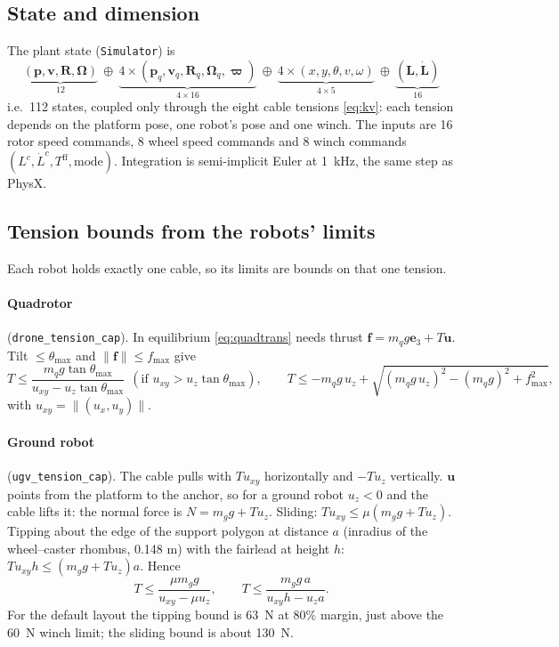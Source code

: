 \documentclass[11pt,a4paper]{article}
\newcommand{\e}{\bm{e}}
\begin{document}
\subsection{State and dimension}
The plant state (\texttt{Simulator}) is
\[
 \underbrace{(\bm p,\bm v,\bm R,\bm\Omega)}_{12}\ \oplus\ \underbrace{4\times(\bm p_q,\bm v_q,\bm R_q,\bm\Omega_q,\bm\varpi)}_{4\times 16}\ \oplus\ \underbrace{4\times(x,y,\theta,v,\omega)}_{4\times 5}\ \oplus\ \underbrace{(\bm L,\dot{\bm L})}_{16}
\]
i.e.\ 112 states, coupled only through the eight cable tensions \eqref{eq:kv}: each tension depends on the
platform pose, one robot's pose and one winch. The inputs are 16 rotor speed commands, 8 wheel speed commands and
8 winch commands $(L^c,\dot L^c,T^{\mathrm{ff}},\text{mode})$. Integration is semi-implicit Euler at 1~kHz, the
same step as PhysX.

\subsection{Tension bounds from the robots' limits}\label{sec:caps}
Each robot holds exactly one cable, so its limits are bounds on that one tension.

\paragraph{Quadrotor} (\texttt{drone\_tension\_cap}). In equilibrium \eqref{eq:quadtrans} needs thrust
$\bm f=m_qg\e_3+T\bm u$. Tilt $\le\theta_{\max}$ and $\|\bm f\|\le f_{\max}$ give
\begin{equation}
 T\le\frac{m_qg\tan\theta_{\max}}{u_{xy}-u_z\tan\theta_{\max}}\ \ (\text{if }u_{xy}>u_z\tan\theta_{\max}),\qquad
 T\le-m_qg\,u_z+\sqrt{(m_qg\,u_z)^2-(m_qg)^2+f_{\max}^2},
 \label{eq:capdrone}
\end{equation}
with $u_{xy}=\|(u_x,u_y)\|$.

\paragraph{Ground robot} (\texttt{ugv\_tension\_cap}). The cable pulls with $T u_{xy}$ horizontally and
$-Tu_z$ vertically. $\bm u$ points from the platform to the anchor, so for a ground robot $u_z<0$ and the cable
lifts it: the normal force is $N=m_gg+Tu_z$. Sliding: $Tu_{xy}\le\mu(m_gg+Tu_z)$. Tipping about the edge of the support
polygon at distance $a$ (inradius of the wheel--caster rhombus, 0.148 m) with the fairlead at height $h$:
$Tu_{xy}h\le(m_gg+Tu_z)a$. Hence
\begin{equation}
 T\le\frac{\mu m_gg}{u_{xy}-\mu u_z},\qquad T\le\frac{m_gg\,a}{u_{xy}h-u_za}.
 \label{eq:capugv}
\end{equation}
For the default layout the tipping bound is 63~N at 80\% margin, just above the 60~N winch limit; the sliding
bound is about 130~N.
\end{document}
